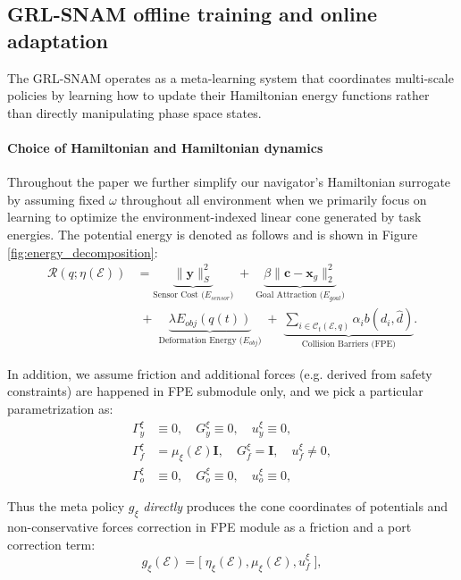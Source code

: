 \documentclass{article} %
\let\vec=\boldsymbol
\begin{document}
\subsection{GRL-SNAM offline training and online adaptation}
\label{subsec:navigator_meta_learner}

The GRL-SNAM operates as a meta-learning system that coordinates multi-scale policies by learning how to update their Hamiltonian energy functions rather than directly manipulating phase space states.


\paragraph{Choice of Hamiltonian and Hamiltonian dynamics}
Throughout the paper we further simplify our navigator's Hamiltonian surrogate by assuming fixed $\omega$ throughout all environment when we primarily focus on learning to optimize the
environment-indexed linear cone generated by task energies. The potential energy is denoted as follows and is shown in Figure \ref{fig:energy_decomposition}:  
\begin{equation}
\begin{aligned}
\mathcal{R}(q; \eta(\mathcal E)) &= \underbrace{\|\vec{y}\|_{S}^2}_{\text{Sensor Cost ($E_{sensor}$)}}
\;+\;
\underbrace{\beta\|\vec{c}-\mathbf{x}_g\|_2^2}_{\text{Goal Attraction ($E_{goal}$)}} \\ &\;+\;
\underbrace{\lambda E_{obj}(q(t))}_{\text{Deformation Energy ($E_{obj}$)}} \;+\;
\underbrace{\sum_{i\in\mathcal{C}_t(\mathcal{E},q)} \alpha_i b(d_i,\hat{d})}_{\text{Collision Barriers (FPE)}} .
\end{aligned}
\end{equation}


In addition, we assume friction and additional forces (e.g. derived from safety constraints) are happened in FPE submodule only, and we pick a particular parametrization as:
\begin{equation}
\begin{aligned}
    \Gamma_y^{\xi} &\equiv 0 ,\quad G_y^{\xi}\equiv 0,\quad u_y^{\xi}\equiv 0, \\
    \Gamma_f^{\xi} &=\mu_\xi(\mathcal{E})\mathbf{I},\quad G_f^{\xi}=\mathbf{I}, \quad u_f^{\xi}\ne 0,\\
    \Gamma_o^{\xi} &\equiv 0 ,\quad G_o^{\xi}\equiv 0,\quad u_o^{\xi}\equiv 0, 
\end{aligned}
\end{equation}

Thus the meta policy $g_\xi$ \emph{directly} produces the cone coordinates of potentials and non-conservative forces correction in FPE module as a friction and a port correction term:
\begin{equation}
g_{\xi}(\mathcal{E})=\big[\;\eta_{\xi}(\mathcal{E}), \mu_\xi(\mathcal{E}) ,u_f^{\xi}\;],    
\label{eq:def:score:function:g}
\end{equation}
\end{document}
